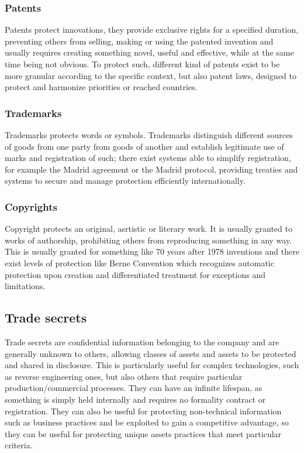 \documentclass[12pt]{article}
\begin{document}
\subsubsection{Patents}
Patents protect innovations, they provide exclusive rights for a specified duration, 
preventing others from selling, making or using the patented invention and usually requires 
creating something novel, useful and effective, while at the same time being not obvious. 
To protect such, different kind of patents exist to be more granular according to the specific 
context, but also patent laws, designed to protect and harmonize priorities or reached countries.

\subsubsection{Trademarks}
Trademarks protects words or symbols. Trademarks distinguish different sources of goods from 
one party from goods of another and establish legitimate use of marks and registration of such; 
there exist systems able to simplify registration, for example the Madrid agreement or the 
Madrid protocol, providing treaties and systems to secure and manage protection efficiently 
internationally.

\subsubsection{Copyrights}
Copyright protects an original, asrtistic or literary work. It is usually granted to works of 
authorship, prohibiting others from reproducing something in any way. 
This is usually granted for something like 70 years after 1978 inventions 
and there exist levels of protection like Berne Convention which recognizes automatic protection 
upon creation and differentiated treatment for exceptions and limitations.

\subsection{Trade secrets}
Trade secrets are confidential information belonging to the company and are generally unknown
to others, allowing classes of assets and assets to be protected and shared in disclosure.
This is particularly useful for complex technologies, such as reverse engineering ones,
but also others that require particular production/commercial processes.
They can have an infinite lifespan, as something is simply held internally and requires no formality
contract or registration.
They can also be useful for protecting non-technical information such as business practices and be
exploited to gain a competitive advantage, so they can be useful for protecting unique assets
practices that meet particular criteria.
\end{document}
